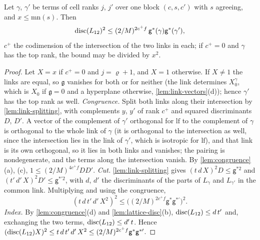 \begin{theorem}[Gain]\label{thm:gain}
Let $\gamma$, $\gamma'$ be terms of cell ranks $j$, $j'$ over one block $(c,s,c')$ with $s$ agreeing, and $x\le\mathrm{mn}(s)$. Then
\[
  \operatorname{disc}(L_{12})^2\le(2/M)^{2c^+f}\,\mathsf g^*(\gamma)\mathsf g^*(\gamma'),
\]
$c^+$ the codimension of the intersection of the two links in each; if $c^+=0$ and $\gamma$ has the top rank, the bound may be divided by $x^2$.
\end{theorem}

\begin{proof}
Let $X=x$ if $c^+=0$ and $j=\varrho+1$, and $X=1$ otherwise. If $X\ne1$ the links are equal, so $\mathfrak g$ vanishes for both or for neither (the link determines $X_0^\gamma$, which is $X_0$ if $\mathfrak g=0$ and a hyperplane
otherwise, \cref{lem:link-vectors}(d)); hence $\gamma'$ has the top rank as well. \emph{Congruence.} Split both links along their intersection by \cref{lem:link-splitting}, with complements $y$, $y'$ of rank $c^+$ and
squared discriminants $D$, $D'$. A vector of the complement of $\gamma'$ orthogonal for $\mathrm{lf}$ to the complement of $\gamma$ is orthogonal to the whole link of $\gamma$ (it is orthogonal to the intersection as well, since the intersection lies in the
link of $\gamma'$, which is isotropic for $\mathrm{lf}$), and that link is its own orthogonal, so it lies in both links and vanishes; the pairing is nondegenerate, and the terms along the intersection vanish. By \cref{lem:congruence}(a), (c),
$1\le(2/M)^{4c^+f}DD'$. \emph{Cut.} \cref{lem:link-splitting} gives $(t\,d\,X)^2D\le\mathsf g^{*2}$ and $(t'\,d'\,X)^2D'\le\mathsf g^{*\prime2}$, with $d$, $d'$ the discriminants of the parts of $L_\gamma$ and $L_{\gamma'}$ in the common link.
Multiplying and using the congruence,
\[
  (t\,d\,t'\,d'\,X^2)^2\le\bigl((2/M)^{2c^+f}\mathsf g^*\mathsf g^{*\prime}\bigr)^2.
\]
\emph{Index.} By \cref{lem:congruence}(d) and \cref{lem:lattice-disc}(b), $\operatorname{disc}(L_{12})\le d\,t'$ and, exchanging the two terms, $\operatorname{disc}(L_{12})\le d'\,t$. Hence $(\operatorname{disc}(L_{12})X)^2\le t\,d\,t'\,d'\,X^2\le(2/M)^{2c^+f}\mathsf g^*\mathsf g^{*\prime}$.
\end{proof}

